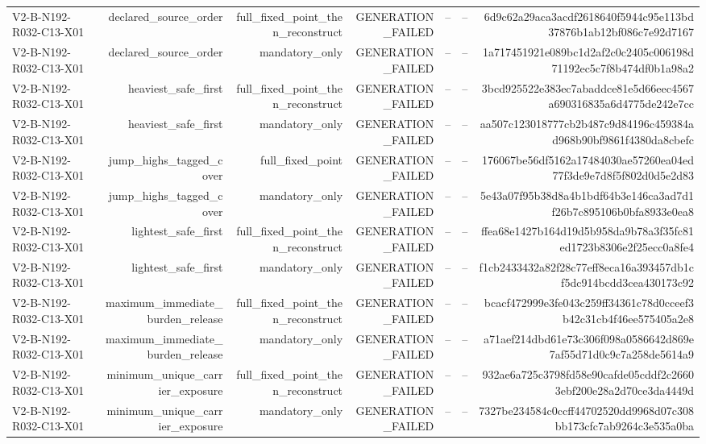 {\begin{longtable}{lrrrrrr}
V2-B-N192-R032-C13-X01 & declared\_source\_order & full\_fixed\_point\_then\_reconstruct & GENERATION\_FAILED & -- & -- & 6d9c62a29aca3acdf2618640f5944c95e113bd37876b1ab12bf086c7e92d7167 \\
V2-B-N192-R032-C13-X01 & declared\_source\_order & mandatory\_only & GENERATION\_FAILED & -- & -- & 1a717451921e089bc1d2af2c0c2405c006198d71192ec5c7f8b474df0b1a98a2 \\
V2-B-N192-R032-C13-X01 & heaviest\_safe\_first & full\_fixed\_point\_then\_reconstruct & GENERATION\_FAILED & -- & -- & 3bcd925522e383ec7abaddce81e5d66eec4567a690316835a6d4775de242e7cc \\
V2-B-N192-R032-C13-X01 & heaviest\_safe\_first & mandatory\_only & GENERATION\_FAILED & -- & -- & aa507c123018777cb2b487c9d84196c459384ad968b90bf9861f4380da8cbefc \\
V2-B-N192-R032-C13-X01 & jump\_highs\_tagged\_cover & full\_fixed\_point & GENERATION\_FAILED & -- & -- & 176067be56df5162a17484030ae57260ea04ed77f3de9e7d8f5f802d0d5e2d83 \\
V2-B-N192-R032-C13-X01 & jump\_highs\_tagged\_cover & mandatory\_only & GENERATION\_FAILED & -- & -- & 5e43a07f95b38d8a4b1bdf64b3e146ca3ad7d1f26b7c895106b0bfa8933e0ea8 \\
V2-B-N192-R032-C13-X01 & lightest\_safe\_first & full\_fixed\_point\_then\_reconstruct & GENERATION\_FAILED & -- & -- & ffea68e1427b164d19d5b958da9b78a3f35fc81ed1723b8306e2f25ecc0a8fe4 \\
V2-B-N192-R032-C13-X01 & lightest\_safe\_first & mandatory\_only & GENERATION\_FAILED & -- & -- & f1cb2433432a82f28c77eff8eca16a393457db1cf5dc914bcdd3cea430173c92 \\
V2-B-N192-R032-C13-X01 & maximum\_immediate\_burden\_release & full\_fixed\_point\_then\_reconstruct & GENERATION\_FAILED & -- & -- & bcacf472999e3fe043c259ff34361c78d0cceef3b42c31cb4f46ee575405a2e8 \\
V2-B-N192-R032-C13-X01 & maximum\_immediate\_burden\_release & mandatory\_only & GENERATION\_FAILED & -- & -- & a71aef214dbd61e73c306f098a0586642d869e7af55d71d0c9c7a258de5614a9 \\
V2-B-N192-R032-C13-X01 & minimum\_unique\_carrier\_exposure & full\_fixed\_point\_then\_reconstruct & GENERATION\_FAILED & -- & -- & 932ae6a725c3798fd58e90cafde05cddf2c26603ebf200e28a2d70ce3da4449d \\
V2-B-N192-R032-C13-X01 & minimum\_unique\_carrier\_exposure & mandatory\_only & GENERATION\_FAILED & -- & -- & 7327be234584c0ccff44702520dd9968d07c308bb173cfc7ab9264c3e535a0ba \\

\end{longtable}}
